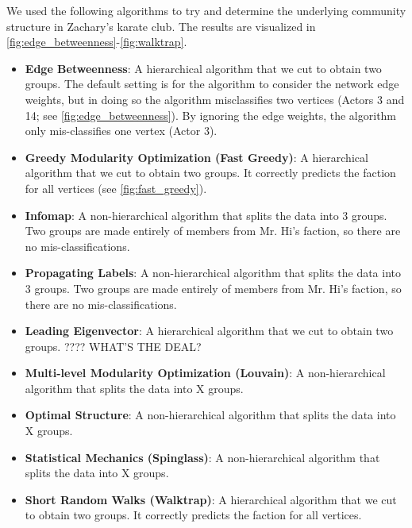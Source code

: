 We used the following algorithms to try and determine the underlying community structure in Zachary's karate club. The results are visualized in \cref{fig:edge_betweenness}-\cref{fig:walktrap}.
\begin{itemize}
\item \textbf{Edge Betweenness}: A hierarchical algorithm that we cut to obtain two groups. The default setting is for the algorithm to consider the network edge weights, but in doing so the algorithm misclassifies two vertices (Actors 3 and 14; see \cref{fig:edge_betweenness}). By ignoring the edge weights, the algorithm only mis-classifies one vertex (Actor 3). 
\item \textbf{Greedy Modularity Optimization (Fast Greedy)}: A hierarchical algorithm that we cut to obtain two groups. It correctly predicts the faction for all vertices (see \cref{fig:fast_greedy}).
\item \textbf{Infomap}: A non-hierarchical algorithm that splits the data into 3 groups. Two groups are made entirely of members from Mr. Hi's faction, so there are no mis-classifications.
\item \textbf{Propagating Labels}: A non-hierarchical algorithm that splits the data into 3 groups. Two groups are made entirely of members from Mr. Hi's faction, so there are no mis-classifications. 
\item \textbf{Leading Eigenvector}: A hierarchical algorithm that we cut to obtain two groups. ???? WHAT'S THE DEAL?
\item \textbf{Multi-level Modularity Optimization (Louvain)}: A non-hierarchical algorithm that splits the data into X groups.
\item \textbf{Optimal Structure}: A non-hierarchical algorithm that splits the data into X groups.
\item \textbf{Statistical Mechanics (Spinglass)}: A non-hierarchical algorithm that splits the data into X groups.
\item \textbf{Short Random Walks (Walktrap)}: A hierarchical algorithm that we cut to obtain two groups. It correctly predicts the faction for all vertices.
\end{itemize}

